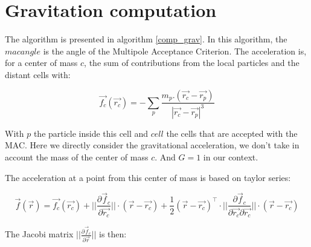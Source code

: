 \documentclass{article}
\begin{document}
%
%


\section{Gravitation computation}

The algorithm is presented in algorithm \ref{comp_grav}.
In this algorithm, the $macangle$ is the angle of the Multipole Acceptance Criterion.
The acceleration is, for a center of mass $c$, the sum of contributions from the local particles and the distant cells with:

\begin{equation}
\vec{f_c}(\vec{r_c}) = -\sum_{p} \frac{m_p.(\vec{r_c}-\vec{r_p})}{|\vec{r_c}-\vec{r_p}|^3}
\end{equation}

With $p$ the particle inside this cell and $cell$ the cells that are accepted with the MAC.
Here we directly consider the gravitational acceleration, we don't take in account the mass of the center of mass $c$. And $G=1$ in our context.

The acceleration at a point from this center of mass is based on taylor series:

\begin{equation}
 \vec{f}(\vec{r}) = \vec{f_c}(\vec{r_c}) + ||\frac{\partial\vec{f}_c}{\partial\vec{r_c}}||\cdot (\vec{r} - \vec{r_c}) + \frac{1}{2} (\vec{r}-\vec{r_c})^\intercal \cdot   ||\frac{\partial\vec{f}_c}{\partial\vec{r_c} \partial\vec{r_c}}|| \cdot (\vec{r} - \vec{r_c})
 \end{equation}

The Jacobi matrix $||\frac{\partial\vec{f}_c}{\partial\vec{r}}||$  is then:
\end{document}
